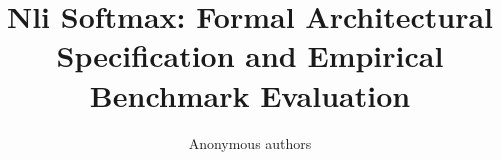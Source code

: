 \title{\textbf{Nli Softmax: Formal Architectural Specification and Empirical Benchmark Evaluation}}

\author{Anonymous authors}
